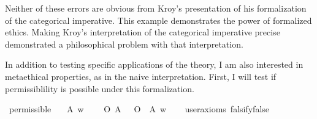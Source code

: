 \begin{isabellebody}
\begin{isamarkuptext}
        Neither of these errors are obvious from Kroy's presentation of his formalization of 
        the categorical imperative. This example demonstrates the power of formalized ethics. Making
        Kroy's interpretation of the categorical imperative precise demonstrated a philosophical problem 
        with that interpretation.%
\end{isamarkuptext}\isamarkuptrue%
%
\isadelimdocument
%
\endisadelimdocument
%
\isatagdocument
%
\isamarkuptrue%
%
\endisatagdocument
{\isafolddocument}%
%
\isadelimdocument
%
\endisadelimdocument
%
\begin{isamarkuptext}%
In addition to testing specific applications of the theory, I am also interested in 
        metaethical properties, as in the naive interpretation. First, I will test if permissiblility
        is possible under this formalization.%
\end{isamarkuptext}\isamarkuptrue%
\isamarkupfalse%
\ permissible{\isacharcolon}\isanewline
\ \ \ A\ w\isanewline
\ \ \ {\isachardoublequoteopen}{\isacharparenleft}{\isacharparenleft}\isactrlbold {\isasymnot}\ {\isacharparenleft}O\ {\isacharbraceleft}A{\isacharbraceright}{\isacharparenright}{\isacharparenright}\ \isactrlbold {\isasymand}\ {\isacharparenleft}\isactrlbold {\isasymnot}\ {\isacharparenleft}O\ {\isacharbraceleft}\isactrlbold {\isasymnot}\ A{\isacharbraceright}{\isacharparenright}{\isacharparenright}{\isacharparenright}\ w{\isachardoublequoteclose}\isanewline
\ \ \isamarkupfalse%
\ {\isacharbrackleft}user{\isacharunderscore}axioms{\isacharcomma}\ falsify{\isacharequal}false{\isacharbrackright}%
\isadelimproof
\ %
\endisadelimproof
%
\isatagproof
{}\isamarkupfalse%
\isanewline
%
\end{isabellebody}
